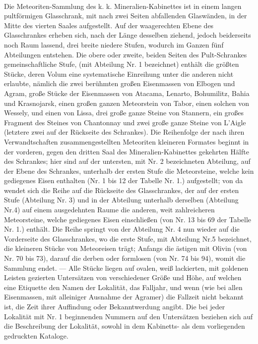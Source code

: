 \documentclass[a4paper, 11pt, oneside, polutonikogreek, german]{article}
\begin{document}
\paragraph{}
Die Meteoriten-Sammlung des k. k. Mineralien-Kabinettes ist in einem langen pultförmigen Glasschrank, mit nach zwei Seiten abfallenden Glaswänden, in der Mitte des vierten Saales aufgestellt. Auf der waagerechten Ebene des Glasschrankes erheben sich, nach der Länge desselben ziehend, jedoch beiderseits noch Raum lassend, drei breite niedere Stufen, wodurch im Ganzen fünf Abteilungen entstehen. Die obere oder zweite, beiden Seiten des Pult-Schrankes gemeinschaftliche Stufe, (mit Abteilung Nr. 1 bezeichnet) enthält die größten Stücke, deren Volum eine systematische Einreihung unter die anderen nicht erlaubte, nämlich die zwei berühmten großen Eisenmassen von Elbogen und Agram, große Stücke der Eisenmassen von Atacama, Lenarto, Bohumilitz, Bahia und Krasnojarsk, einen großen ganzen Meteorstein von Tabor, einen solchen von Wessely, und einen von Lissa, drei große ganze Steine von Stannern, ein großes Fragment des Steines von Chantonnay und zwei große ganze Steine von L’Aigle (letztere zwei auf der Rückseite des Schrankes). Die Reihenfolge der nach ihren Verwandtschaften zusammengestellten Meteoriten kleineren Formates beginnt in der vorderen, gegen den dritten Saal des Mineralien-Kabinettes gekehrten Hälfte des Schrankes; hier sind auf der untersten, mit Nr. 2 bezeichneten Abteilung, auf der Ebene des Schrankes, unterhalb der ersten Stufe die Meteorsteine, welche kein gediegenes Eisen enthalten (Nr. 1 bis 12 der Tabelle Nr. 1.) aufgestellt; von da wendet sich die Reihe auf die Rückseite des Glasschrankes, der auf der ersten Stufe (Abteilung Nr. 3) und in der Abteilung unterhalb derselben (Abteilung Nr.4) auf einem ausgedehnten Raume die anderen, weit zahlreicheren Meteorsteine, welche gediegenes Eisen einschließen (von Nr. 13 bis 69 der Tabelle Nr. 1.) enthält. Die Reihe springt von der Abteilung Nr. 4 nun wieder auf die Vorderseite des Glasschrankes, wo die erste Stufe, mit Abteilung Nr.5 bezeichnet, die kleineren Stücke von Meteoreisen trägt; Anfangs die ästigen mit Olivin (von Nr. 70 bis 73), darauf die derben oder formlosen (von Nr. 74 bis 94), womit die Sammlung endet. — Alle Stücke liegen auf ovalen, weiß lackierten, mit goldenen Leisten gezierten Untersätzen von verschiedener Größe und Höhe, auf welchen eine Etiquette den Namen der Lokalität, das Falljahr, und wenn (wie bei allen Eisenmassen, mit alleiniger Ausnahme der Agramer) die Fallzeit nicht bekannt ist, die Zeit ihrer Auffindung oder Bekanntwerdung angibt. Die bei jeder Lokalität mit Nr. 1 beginnenden Nummern auf den Untersätzen beziehen sich auf die Beschreibung der Lokalität, sowohl in dem Kabinetts- als dem vorliegenden gedruckten Kataloge.
\end{document}
